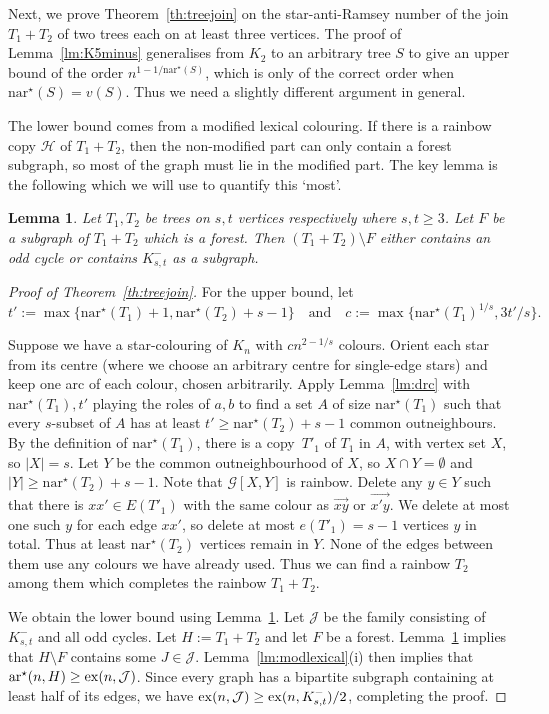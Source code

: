 \documentclass[a4paper, 12pt]{article}
\numberwithin{equation}{section}
\newtheorem{lemma}[theorem]{Lemma}
\def\sm{{\setminus}}
\def\sar{{\mathrm{ar}^{\star}}}
\def\nsar{{\mathrm{n}\sar}}
\newcommand{\mc}[1]{\mathcal{#1}}
\newcommand{\ms}[1]{\mathscr{#1}}
\begin{document}
 

Next, we prove Theorem~\ref{th:treejoin} on the star-anti-Ramsey number of the join $T_1+T_2$ of two trees each on at least three vertices.
The proof of Lemma~\ref{lm:K5minus} generalises from $K_2$ to an arbitrary tree $S$ to give an upper bound of the order $n^{1-1/\nsar(S)}$, which is only of the correct order when $\nsar(S) = v(S)$. Thus we need a slightly different argument in general.

The lower bound comes from a modified lexical colouring. If there is a rainbow copy $\ms{H}$ of $T_1+T_2$, then the non-modified part can only contain a forest subgraph, so most of the graph must lie in the modified part.
The key lemma is the following which we will use to quantify this `most'.

    \begin{lemma}\label{lm:redblue}
        Let $T_1,T_2$ be trees on $s,t$ vertices respectively where $s,t \geq 3$.
        Let $F$ be a subgraph of $T_1+T_2$ which is a forest. Then $(T_1+T_2) \sm F$ 
        either contains an odd cycle or contains $K^-_{s,t}$ as a subgraph.
    \end{lemma}

    
\begin{proof}[Proof of Theorem~\ref{th:treejoin}]
For the upper bound, let
$$
t' := \max\{\nsar(T_1)+1,\nsar(T_2)+s-1\}
\quad\text{and}\quad
c := \max\{\nsar(T_1)^{1/s},3t'/s\}.
$$

Suppose we have a star-colouring of $K_n$ with $cn^{2-1/s}$ colours.
    Orient each star from its centre (where we choose an arbitrary centre for single-edge stars) and keep one arc of each colour, chosen arbitrarily.  
  Apply Lemma~\ref{lm:drc} with $\nsar(T_1),t'$ playing the roles of $a,b$ to find a set $A$ of size $\nsar(T_1)$ such that every $s$-subset of $A$ has at least $t' \geq \nsar(T_2)+s-1$ common outneighbours.
    By the definition of $\nsar(T_1)$, there is a copy~$T'_1$ of $T_1$ in $A$, with vertex set $X$, so $|X|=s$.
    Let $Y$ be the common outneighbourhood of $X$, so $X \cap Y = \emptyset$ and $|Y| \geq \nsar(T_2)+s-1$. Note that $\ms{G}[X,Y]$ is rainbow. Delete any $y \in Y$ such that there is $xx' \in E(T'_1)$ with the same colour as $\overrightarrow{xy}$ or $\overrightarrow{x'y}$.
    We delete at most one such $y$ for each edge $xx'$, so delete at most $e(T'_1)=s-1$ vertices $y$ in total.
    Thus at least $\nsar(T_2)$ vertices remain in $Y$.
    None of the edges between them use any colours we have already used.
    Thus we can find a rainbow $T_2$ among them which completes the rainbow $T_1+T_2$.


We obtain the lower bound using Lemma~\ref{lm:redblue}.
Let $\mc{J}$ be the family consisting of $K^-_{s,t}$ and all odd cycles.
Let $H := T_1+T_2$ and let $F$ be a forest. 
Lemma~\ref{lm:redblue} implies that $H \sm F$ 
contains some $J \in \mc{J}$.
Lemma~\ref{lm:modlexical}(i) then implies that $\sar(n,H) \geq {\rm ex}(n,\mc{J})$.
Since every graph has a bipartite subgraph containing at least half of its edges, we have ${\rm ex}(n,\mc{J}) \geq {\rm ex}(n,K^-_{s,t})/2$, completing the proof.
\end{proof}
\end{document}
